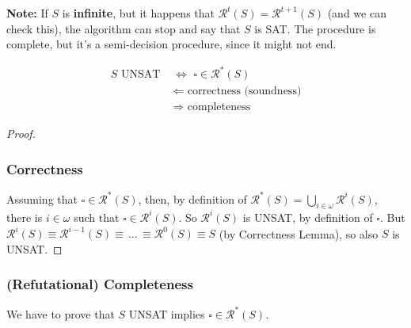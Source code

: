 \textbf{Note:} If $S$ is \textbf{infinite}, but it happens that $\mathcal{R}^t (S) = \mathcal{R}^{t+1} (S)$ (and we can check this), the algorithm can stop and say that $S$ is SAT. The procedure is complete, but it's a semi-decision procedure, since it might not end.



%

\begin{theorem}
  \begin{align*}
	S \text{ UNSAT} \,\, &\Leftrightarrow \,\, \square \in \mathcal{R}^{*}(S) \\
	&\Leftarrow \,\,  \text{correctness (soundness)} \\
	&\Rightarrow \,\, \text{completeness}
  \end{align*}
\end{theorem}

\begin{proof} \hspace{1cm} \vspace{-0.25cm}

\subsubsection{Correctness}
Assuming that $\square \in \mathcal{R}^\ast (S)$, then, by definition of $\mathcal{R}^\ast (S) = \bigcup_{i \in \omega} \mathcal{R}^i (S)$, there is $i \in \omega$ such that $\square \in \mathcal{R}^i (S)$. So $\mathcal{R}^i (S)$ is UNSAT, by definition of $\square$.
But $\mathcal{R}^i (S) \equiv \mathcal{R}^{i-1} (S) \equiv \, \dots \, \equiv \mathcal{R}^0 (S) \equiv S$ (by Correctness Lemma), so also $S$ is UNSAT.

\end{proof}

\subsubsection{(Refutational) Completeness}
We have to prove that $S$ UNSAT implies $\square \in \mathcal{R}^\ast (S)$.

